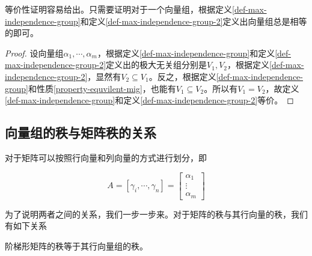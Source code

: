等价性证明容易给出。只需要证明对于一个向量组，根据定义\ref{def-max-independence-group}和定义\ref{def-max-independence-group-2}定义出向量组总是相等的即可。

\begin{proof}
    设向量组$\alpha_1,\cdots,\alpha_m$，根据定义\ref{def-max-independence-group}和定义\ref{def-max-independence-group-2}定义出的极大无关组分别是$V_1,V_2$，根据定义\ref{def-max-independence-group-2}，显然有$V_2\subseteq V_1$。反之，根据定义\ref{def-max-independence-group}和性质\ref{property-equvilent-mig}，也能有$V_1\subseteq V_2$。所以有$V_1=V_2$，故定义\ref{def-max-independence-group}和定义\ref{def-max-independence-group-2}等价。
\end{proof}

\subsection{向量组的秩与矩阵秩的关系}

对于矩阵可以按照行向量和列向量的方式进行划分，即

\[
    A=[\gamma_i,\cdots,\gamma_n]=\begin{bmatrix}
        \alpha_1\\\vdots\\\alpha_m
    \end{bmatrix}
\]

为了说明两者之间的关系，我们一步一步来。对于矩阵的秩与其行向量的秩，我们有如下关系

\begin{thm}
    \label{thm-rank-matrix-row-vector}
    阶梯形矩阵的秩等于其行向量组的秩。
\end{thm}

